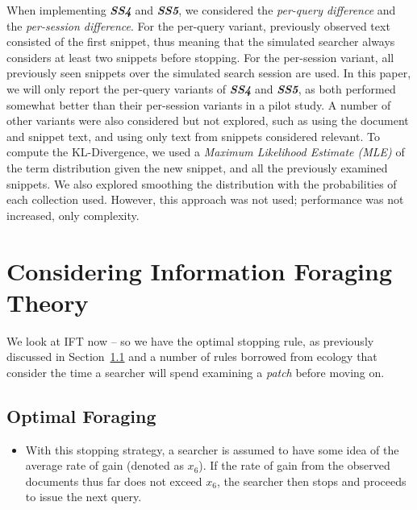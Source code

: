 When implementing \textbf{\emph{SS4}} and \textbf{\emph{SS5}}, we considered the \emph{per-query difference} and the \emph{per-session difference}. For the per-query variant, previously observed text consisted of the first snippet, thus meaning that the simulated searcher always considers at least two snippets before stopping. For the per-session variant, all previously seen snippets over the simulated search session are used. In this paper, we will only report the per-query variants of \textbf{\emph{SS4}} and \textbf{\emph{SS5}}, as both performed somewhat better than their per-session variants in a pilot study. A number of other variants were also considered but not explored, such as using the document and snippet text, and using only text from snippets considered relevant. To compute the KL-Divergence, we used a \emph{Maximum Likelihood Estimate (MLE)} of the term distribution given the new snippet, and all the previously examined snippets. We also explored smoothing the distribution with the probabilities of each collection used. However, this approach was not used; performance was not increased, only complexity.

\section{Considering Information Foraging Theory}
We look at IFT now -- so we have the optimal stopping rule, as previously discussed in Section~\ref{} and a number of rules borrowed from ecology that consider the time a searcher will spend examining a \emph{patch} before moving on.

\subsection{Optimal Foraging}

\begin{itemize}
    \item[\blueboxbold{SS8}] With this stopping strategy, a searcher is assumed to have some idea of the average rate of gain (denoted as $x_6$). If the rate of gain from the observed documents thus far does not exceed $x_6$, the searcher then stops and proceeds to issue the next query.
\end{itemize}

